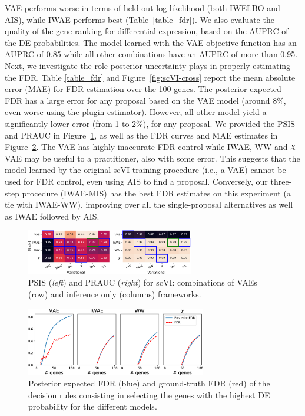 VAE performs worse in terms of held-out log-likelihood (both IWELBO and AIS), while IWAE performs best (Table~\ref{table_fdr}). We also evaluate the quality of the gene ranking for differential expression, based on the AUPRC of the DE probabilities. The model learned with the VAE objective function has an AUPRC of 0.85 while all other combinations have an AUPRC of more than 0.95. Next, we investigate the role posterior uncertainty plays in properly estimating the FDR.  
Table \ref{table_fdr} and Figure~\ref{fig:scVI-cross} report the mean absolute error (MAE) for FDR estimation over the 100 genes. The posterior expected FDR has a large error for any proposal based on the VAE model (around 8\%, even worse using the plugin estimator). However, all other model yield a significantly lower error (from 1 to 2\%), for any proposal. 
We provided the PSIS and PRAUC in Figure~\ref{fig:XscVI-cross-other}, as well as the FDR curves and MAE estimates in Figure~\ref{fig:YscVI-cross-other}. The VAE has highly inaccurate FDR control while IWAE, WW and $\rchi$-VAE may be useful to a practitioner, also with some error. 
This suggests that the model learned by the original scVI training procedure (i.e., a VAE) cannot be used for FDR control, even using AIS to find a proposal. Conversely, our three-step procedure (IWAE-MIS) has the best FDR estimates on this experiment (a tie with IWAE-WW), improving over all the single-proposal alternatives as well as IWAE followed by AIS. %


\begin{figure}
    \centering
    \includegraphics[width=0.65\textwidth]{figures/fdr_other_cross.pdf}
    \caption[PSIS and PRAUC for scVI]{
    PSIS (\textit{left}) and PRAUC (\textit{right}) for scVI: combinations of VAEs (row) and inference only (columns) frameworks. 
    }
    \label{fig:XscVI-cross-other}
\end{figure}


\begin{figure}
    \centering
    \includegraphics[width=0.7\textwidth]{figures/fdr_curves_gen.pdf}
    \caption[Posterior expected FDR and ground-truth FDR for the diferent models]{
    Posterior expected FDR (blue) and ground-truth FDR (red) of the decision rules consisting in selecting the genes with the highest DE probability for the different models.
    }
    \label{fig:YscVI-cross-other}
\end{figure}

